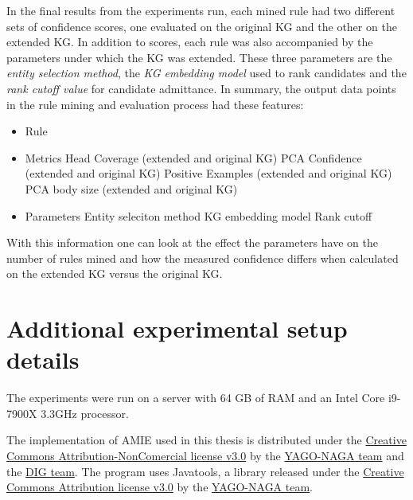 In the final results from the experiments run, each mined rule had two different sets of confidence scores, one evaluated on the original KG and the other on the extended KG. In addition to scores, each rule was also accompanied by the parameters under which the KG was extended. These three parameters are the \textit{entity selection method}, the \textit{KG embedding model} used to rank candidates and the \textit{rank cutoff value} for candidate admittance. In summary, the output data points in the rule mining and evaluation process had these features:
\begin{itemize}
    \item Rule
    \item Metrics
        \subitem Head Coverage (extended and original KG)
        \subitem PCA Confidence (extended and original KG)
        \subitem Positive Examples (extended and original KG)
        \subitem PCA body size (extended and original KG)
    \item Parameters
        \subitem Entity seleciton method
        \subitem KG embedding model
        \subitem Rank cutoff
\end{itemize}

With this information one can look at the effect the parameters have on the number of rules mined and how the measured confidence differs when calculated on the extended KG versus the original KG.


\section{Additional experimental setup details}
The experiments were run on a server with 64 GB of RAM and an Intel Core i9-7900X 3.3GHz processor.

The implementation of AMIE used in this thesis is distributed under the \hyperlink{https://creativecommons.org/licenses/by-nc/3.0/}{Creative Commons Attribution-NonComercial license v3.0} by the \hyperlink{https://www.mpi-inf.mpg.de/departments/databases-and-information-systems/research/yago-naga/amie/}{YAGO-NAGA team} and the \hyperlink{https://dig.telecom-paris.fr/blog/}{DIG team}. The program uses Javatools, a library released under the \hyperlink{https://creativecommons.org/licenses/by/3.0/}{Creative Commons Attribution license v3.0} by the \hyperlink{https://www.mpi-inf.mpg.de/departments/databases-and-information-systems/research/yago-naga/amie/}{YAGO-NAGA team}.
